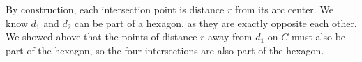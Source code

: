 \documentclass[12pt]{article}
\begin{document}
By construction, each intersection point is distance $r$ from its arc center. We know $d_1$ and $d_2$ can be part of a hexagon, as they are exactly opposite each other. We showed above that the points of distance $r$ away from $d_1$ on $C$ must also be part of the hexagon, so the four intersections are also part of the hexagon. 

\section{}
\section{}
\end{document}
